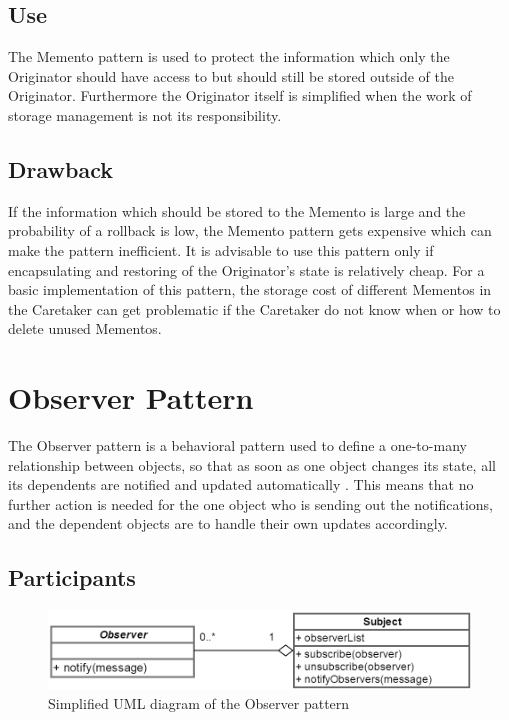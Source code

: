 \documentclass{bioinfo}
\begin{document}
\subsection{Use}
The Memento pattern is used to protect the information which only the Originator should have access to but should still be stored outside of the Originator. Furthermore the Originator itself is simplified when the work of storage management is not its responsibility. \cite{gang4}  

\subsection{Drawback}
If the information which should be stored to the Memento is large and the probability of a rollback is low, the Memento pattern gets expensive which can make the pattern inefficient. It is advisable to use this pattern only if encapsulating and restoring of the Originator's state is relatively cheap. For a basic implementation of this pattern, the storage cost of different Mementos in the Caretaker can get problematic if the Caretaker do not know when or how to delete unused Mementos. \cite{gang4}

\section{Observer Pattern}
The Observer pattern is a behavioral pattern used to define a one-to-many relationship between objects, so that as soon as one object changes its state, all its dependents are notified and updated automatically \cite{sourcem}. This means that no further action is needed for the one object who is sending out the notifications, and the dependent objects are to handle their own updates accordingly.

\subsection{Participants}

\begin{figure}[ht]
    \centering
    \includegraphics[width=1\linewidth]{img/observer-uml.png}
    \caption{Simplified UML diagram of the Observer pattern}
    \label{fig:Observer_pattern}
\end{figure}
\end{document}
